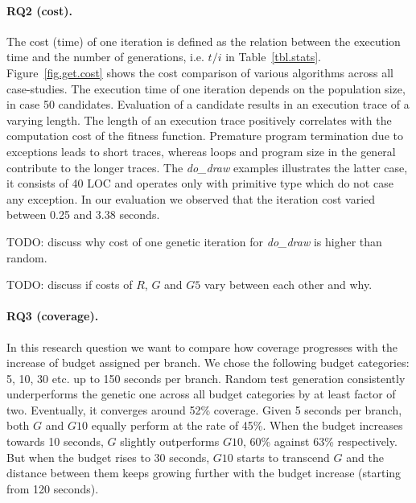 \documentclass[sigconf]{acmart}
\begin{document}
\paragraph{\textbf{RQ2 (cost).}} The cost (time) of one iteration is defined as the relation between the execution time and the number of generations, i.e. $t/i$ in Table~\ref{tbl.stats}. Figure~\ref{fig.get.cost} shows the cost comparison of various algorithms across all case-studies. The execution time of one iteration depends on the population size, in case 50 candidates. Evaluation of a candidate results in an execution trace of a varying length. The length of an execution trace positively correlates with the computation cost of the fitness function. Premature program termination due to exceptions leads to short traces, whereas loops and program size in the general contribute to the longer traces. The \emph{do_draw} examples illustrates the latter case, it consists of 40 LOC and operates only with primitive type which do not case any exception. In our evaluation we observed that the iteration cost varied between 0.25 and 3.38 seconds. 

TODO: discuss why cost of one genetic iteration for \emph{do_draw} is higher than random.

TODO: discuss if costs of $R$, $G$ and $G5$ vary between each other and why.

\paragraph{\textbf{RQ3 (coverage).}} In this research question we want to compare how coverage progresses with the increase of budget assigned per branch. We chose the following budget categories: 5, 10, 30 etc. up to 150 seconds per branch. Random test generation consistently underperforms the genetic one across all budget categories by at least factor of two. Eventually, it converges around 52\% coverage. Given 5 seconds per branch, both $G$ and $G10$ equally perform at the rate of 45\%. When the budget increases towards 10 seconds, $G$ slightly outperforms $G10$, 60\% against 63\% respectively. But when the budget rises to 30 seconds, $G10$ starts to transcend $G$ and the distance between them keeps growing further with the budget increase (starting from 120 seconds).  
\end{document}
